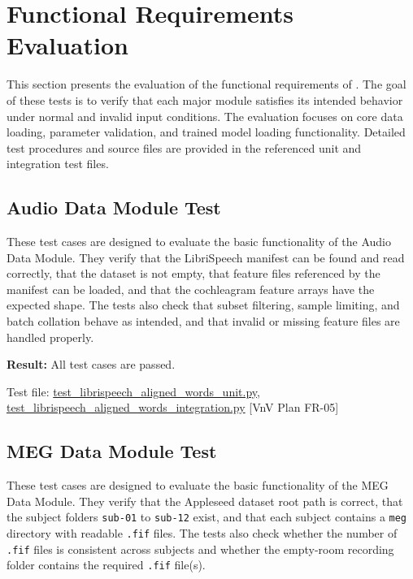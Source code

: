 \documentclass[12pt, titlepage]{article}
\begin{document}
\section{Functional Requirements Evaluation}
\label{sec_funcEval}

This section presents the evaluation of the functional requirements of \progname.
The goal of these tests is to verify that each major module satisfies its intended behavior under normal and invalid input conditions.
The evaluation focuses on core data loading, parameter validation, and trained model loading functionality.
Detailed test procedures and source files are provided in the referenced unit and integration test files.

\subsection{Audio Data Module Test}

These test cases are designed to evaluate the basic functionality of the Audio Data Module.
They verify that the LibriSpeech manifest can be found and read correctly, that the dataset is not empty, that feature files referenced by the manifest can be loaded, and that the cochleagram feature arrays have the expected shape.
The tests also check that subset filtering, sample limiting, and batch collation behave as intended, and that invalid or missing feature files are handled properly.

\textbf{Result:} All test cases are passed.

Test file: \href{https://github.com/Krozix-2026/cas741-speech-trf/blob/main/src/test/test_librispeech_aligned_words_unit.py}{test\_librispeech\_aligned\_words\_unit.py}, \\ \href{https://github.com/Krozix-2026/cas741-speech-trf/blob/main/src/test/test_librispeech_aligned_words_integration.py}{test\_librispeech\_aligned\_words\_integration.py} [VnV Plan FR-05]

\subsection{MEG Data Module Test}

These test cases are designed to evaluate the basic functionality of the MEG Data Module.
They verify that the Appleseed dataset root path is correct, that the subject folders \texttt{sub-01} to \texttt{sub-12} exist, and that each subject contains a \texttt{meg} directory with readable \texttt{.fif} files.
The tests also check whether the number of \texttt{.fif} files is consistent across subjects and whether the empty-room recording folder contains the required \texttt{.fif} file(s).
\end{document}
